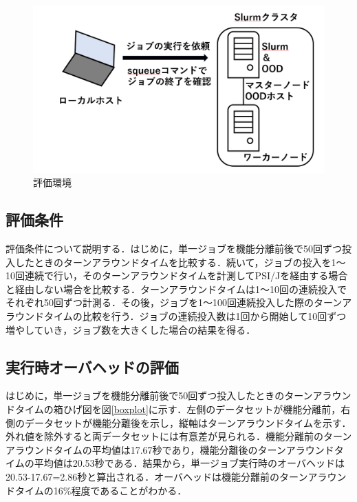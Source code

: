 \begin{figure}[tb]
    \centering
    \includegraphics[width=120mm]{./fig/evaluation_environment.png}
    \caption{評価環境}
    \label{evaluation_environment}
\end{figure}

\subsection{評価条件}
評価条件について説明する．はじめに，単一ジョブを機能分離前後で50回ずつ投入したときのターンアラウンドタイムを比較する．続いて，ジョブの投入を1～10回連続で行い，そのターンアラウンドタイムを計測してPSI/Jを経由する場合と経由しない場合を比較する．ターンアラウンドタイムは1～10回の連続投入でそれぞれ50回ずつ計測る．その後，ジョブを1～100回連続投入した際のターンアラウンドタイムの比較を行う．ジョブの連続投入数は1回から開始して10回ずつ増やしていき，ジョブ数を大きくした場合の結果を得る．\par

\subsection{実行時オーバヘッドの評価}
はじめに，単一ジョブを機能分離前後で50回ずつ投入したときのターンアラウンドタイムの箱ひげ図を図\ref{boxplot}に示す．左側のデータセットが機能分離前，右側のデータセットが機能分離後を示し，縦軸はターンアラウンドタイムを示す．外れ値を除外すると両データセットには有意差が見られる．機能分離前のターンアラウンドタイムの平均値は17.67秒であり，機能分離後のターンアラウンドタイムの平均値は20.53秒である．結果から，単一ジョブ実行時のオーバヘッドは20.53-17.67=2.86秒と算出される．オーバヘッドは機能分離前のターンアラウンドタイムの16\%程度であることがわかる．\par

